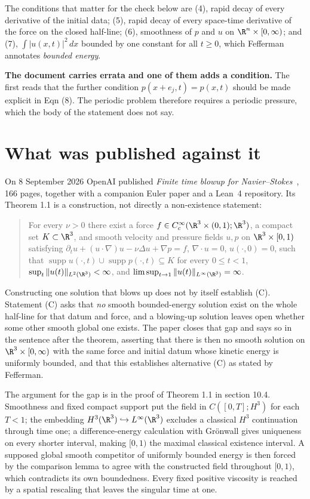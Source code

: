 The conditions that matter for the check below are (4), rapid decay of every derivative of the
initial data; (5), rapid decay of every space-time derivative of the force on the closed half-line;
(6), smoothness of $p$ and $u$ on $\R^n\times[0,\infty)$; and (7), $\int|u(x,t)|^2\,dx$ bounded by
one constant for all $t\ge0$, which Fefferman annotates \emph{bounded energy}.

\textbf{The document carries errata and one of them adds a condition.} The first reads that the further
condition $p(x+e_j,t)=p(x,t)$ should be made explicit in Eqn (8). The periodic problem therefore
requires a periodic pressure, which the body of the statement does not say.

\section{What was published against it}

On 8 September 2026 OpenAI published \emph{Finite time blowup for
Navier--Stokes}~\cite{src:OpenAI-2026-Navier-Stokes}, 166 pages, together with a companion Euler
paper and a Lean~4 repository. Its Theorem 1.1 is a construction, not directly a non-existence
statement:

\begin{quote}
For every $\nu>0$ there exist a force $f \in C_c^\infty(\R^3\times(0,1);\R^3)$, a compact set
$K\subset\R^3$, and smooth velocity and pressure fields $u,p$ on $\R^3\times[0,1)$ satisfying
$\partial_t u + (u\cdot\nabla)u - \nu\Delta u + \nabla p = f$, $\nabla\cdot u = 0$,
$u(\cdot,0)=0$, such that $\operatorname{supp} u(\cdot,t)\cup\operatorname{supp}p(\cdot,t)\subseteq
K$ for every $0\le t<1$, $\sup_t \|u(t)\|_{L^2(\R^3)} < \infty$, and
$\limsup_{t\to1}\|u(t)\|_{L^\infty(\R^3)} = \infty$.
\end{quote}

Constructing one solution that blows up does not by itself establish (C). Statement (C) asks that
\emph{no} smooth bounded-energy solution exist on the whole half-line for that datum and force, and
a blowing-up solution leaves open whether some other smooth global one exists. The paper closes
that gap and says so in the sentence after the theorem, asserting that there is then no smooth
solution on $\R^3\times[0,\infty)$ with the same force and initial datum whose kinetic
energy is uniformly bounded, and that this establishes alternative (C) as stated by Fefferman.

The argument for the gap is in the proof of Theorem 1.1 in section 10.4. Smoothness and fixed
compact support put the field in $C([0,T];H^3)$ for each $T<1$; the embedding
$H^3(\R^3)\hookrightarrow L^\infty(\R^3)$ excludes a classical $H^3$ continuation through time one;
a difference-energy calculation with Gr\"onwall gives uniqueness on every shorter interval, making
$[0,1)$ the maximal classical existence interval. A supposed global smooth competitor of uniformly
bounded energy is then forced by the comparison lemma to agree with the constructed field
throughout $[0,1)$, which contradicts its own boundedness. Every fixed positive viscosity is
reached by a spatial rescaling that leaves the singular time at one.

